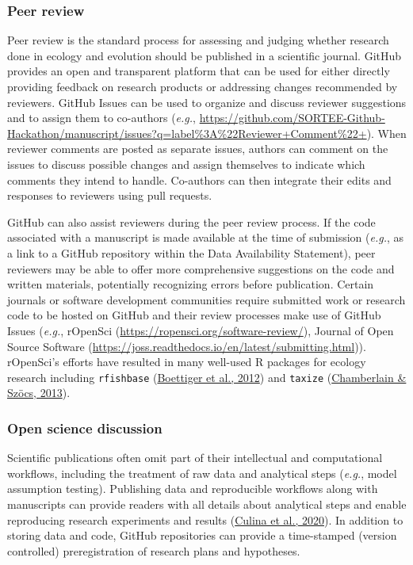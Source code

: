 \hypertarget{peer-review}{%
\subsubsection{Peer review}\label{peer-review}}

Peer review is the standard process for assessing and judging whether research done in ecology and evolution should be published in a scientific journal.
GitHub provides an open and transparent platform that can be used for either directly providing feedback on research products or addressing changes recommended by reviewers.
GitHub Issues can be used to organize and discuss reviewer suggestions and to assign them to co-authors (\emph{e.g.}, \url{https://github.com/SORTEE-Github-Hackathon/manuscript/issues?q=label\%3A\%22Reviewer+Comment\%22+}).
When reviewer comments are posted as separate issues, authors can comment on the issues to discuss possible changes and assign themselves to indicate which comments they intend to handle.
Co-authors can then integrate their edits and responses to reviewers using pull requests.

GitHub can also assist reviewers during the peer review process.
If the code associated with a manuscript is made available at the time of submission (\emph{e.g.}, as a link to a GitHub repository within the Data Availability Statement), peer reviewers may be able to offer more comprehensive suggestions on the code and written materials, potentially recognizing errors before publication.
Certain journals or software development communities require submitted work or research code to be hosted on GitHub and their review processes make use of GitHub Issues (\emph{e.g.}, rOpenSci (\url{https://ropensci.org/software-review/}), Journal of Open Source Software (\url{https://joss.readthedocs.io/en/latest/submitting.html})).
rOpenSci's efforts have resulted in many well-used R packages for ecology research including \texttt{rfishbase} (\protect\hyperlink{ref-Xsdcv6q}{Boettiger et al., 2012}) and \texttt{taxize} (\protect\hyperlink{ref-FVBWKkZu}{Chamberlain \& Szöcs, 2013}).

\hypertarget{open-science-discussion}{%
\subsubsection{Open science discussion}\label{open-science-discussion}}

Scientific publications often omit part of their intellectual and computational workflows, including the treatment of raw data and analytical steps (\emph{e.g.}, model assumption testing).
Publishing data and reproducible workflows along with manuscripts can provide readers with all details about analytical steps and enable reproducing research experiments and results (\protect\hyperlink{ref-NOgBWVAr}{Culina et al., 2020}).
In addition to storing data and code, GitHub repositories can provide a time-stamped (version controlled) preregistration of research plans and hypotheses.

